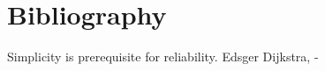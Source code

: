 %
%
\cleardoublepage
{}
\chapter*{Bibliography}
\chpos{25mm}{8mm}

 {Simplicity is prerequisite for reliability.\vspace{4mm}}
 {Edsger Dijkstra,  - }

{\footnotesize

}
